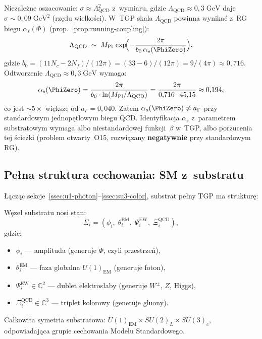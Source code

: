 \begin{remark}%
\label{rem:sigma-alt}
Niezależne oszacowanie: $\sigma \approx \Lambda_{\mathrm{QCD}}^2$
z~wymiaru, gdzie $\Lambda_{\mathrm{QCD}} \approx 0{,}3\;\mathrm{GeV}$
daje $\sigma \sim 0{,}09\;\mathrm{GeV}^2$ (rzędu wielkości).
W~TGP skala $\Lambda_{\mathrm{QCD}}$ powinna wynikać z~RG biegu
$\alpha_s(\Phi)$ (prop.~\ref{prop:running-coupling}):
\begin{equation}\label{eq:LQCD-from-TGP}
    \Lambda_{\mathrm{QCD}} \;\sim\; M_{\mathrm{Pl}}\,
    \exp\!\Bigl(-\frac{2\pi}{b_0\,\alpha_s(\PhiZero)}\Bigr),
\end{equation}
gdzie $b_0 = (11N_c - 2N_f)/(12\pi) = (33-6)/(12\pi) = 9/(4\pi) \approx 0{,}716$.
Odtworzenie $\Lambda_{\mathrm{QCD}} \approx 0{,}3\;\mathrm{GeV}$
wymaga:
\begin{equation}\label{eq:alphas-required}
    \alpha_s(\PhiZero) = \frac{2\pi}{b_0 \cdot \ln(M_{\mathrm{Pl}}/\Lambda_{\mathrm{QCD}})}
    = \frac{2\pi}{0{,}716 \cdot 45{,}15} \approx 0{,}194,
\end{equation}
co jest $\sim 5\times$ większe od $a_{\Gamma} = 0{,}040$.
Zatem $\alpha_s(\PhiZero) \neq a_{\Gamma}$ przy standardowym
jednopętlowym biegu QCD. Identyfikacja $\alpha_s$ z~parametrem
substratowym wymaga albo niestandardowej funkcji~$\beta$ w~TGP,
albo porzucenia tej ścieżki (problem otwarty~O15, rozwiązany
\textbf{negatywnie} przy standardowym RG).
\end{remark}

\subsection{Pełna struktura cechowania: SM z~substratu}%
\label{ssec:full-gauge}

Łącząc sekcje~\ref{ssec:u1-photon}--\ref{ssec:su3-color},
substrat pełny TGP ma strukturę:

\begin{definition}\label{def:full-substrate}
Węzeł substratu nosi stan:
\begin{equation}\label{eq:full-substrate-state}
    \Sigma_i = (\phi_i,\;\theta_i^{\mathrm{EM}},\;\Psi_i^{\mathrm{EW}},
                \;\Xi_i^{\mathrm{QCD}}),
\end{equation}
gdzie:
\begin{itemize}[nosep]
    \item $\phi_i$ --- amplituda (generuje $\Phi$, czyli przestrze\'n),
    \item $\theta_i^{\mathrm{EM}}$ --- faza globalna $U(1)_{\mathrm{EM}}$
          (generuje foton),
    \item $\Psi_i^{\mathrm{EW}} \in \mathbb{C}^2$ --- dublet
          elektrosłaby (generuje $W^\pm$, $Z$, Higgs),
    \item $\Xi_i^{\mathrm{QCD}} \in \mathbb{C}^3$ --- triplet
          kolorowy (generuje gluony).
\end{itemize}
Całkowita symetria substratowa: $U(1)_{\mathrm{EM}} \times SU(2)_L
\times SU(3)_c$, odpowiadająca grupie cechowania Modelu Standardowego.
\end{definition}

